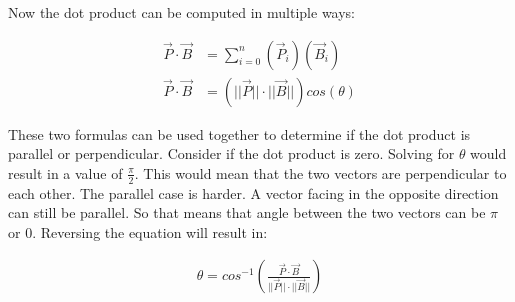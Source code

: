 \begin{center}  \end{center}

Now the dot product can be computed in multiple ways:

\begin{align*}	
	\vec{P} \cdot \vec{B} &= \sum^{n}_{i=0} (\vec{P}_i)(\vec{B}_i) \\ 
	\vec{P} \cdot \vec{B} &= (|| \vec{P} || \cdot || \vec{B} || )cos(\theta)
\end{align*}

These two formulas can be used together to determine if the dot product is parallel or perpendicular. 
Consider if the dot product is zero. Solving for $\theta$ would result in a value of $\frac{\pi}{2}$. This would mean that the two vectors
are perpendicular to each other. The parallel case is harder. 
A vector facing in the opposite direction can still be parallel. So that means that angle between the two vectors can be $\pi$ or $0$. Reversing the equation will result in: 

\begin{align*}
	\theta = cos^{-1}(\frac{\vec{P} \cdot \vec{B}}{|| \vec{P} || \cdot || \vec{B} ||})
\end{align*}